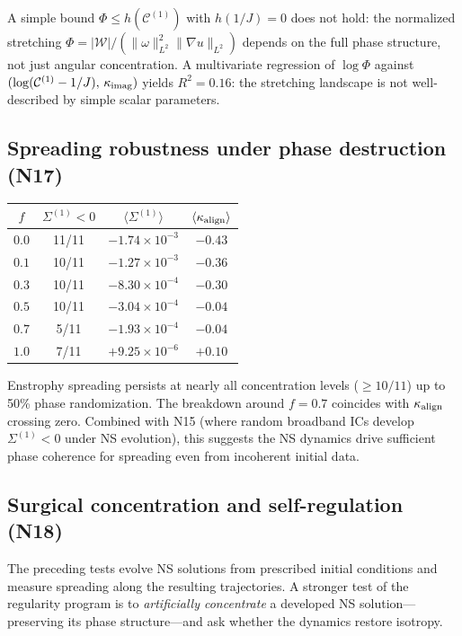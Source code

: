 \documentclass[11pt]{article}
\theoremstyle{definition}
\newcommand{\cC}{\mathcal{C}}
\begin{document}
A simple bound $\Phi\leq h(\cC^{(1)})$ with
$h(1/J)=0$ does not hold: the normalized stretching
$\Phi = |\mathcal{W}|/(\|\omega\|_{L^2}^2
\|\nabla u\|_{L^2})$ depends on the full phase
structure, not just angular concentration.
A multivariate regression of $\log\Phi$ against
$(\log(\cC^{(1)}-1/J),\,\kappa_{\rm imag})$ yields
$R^2=0.16$: the stretching landscape is not
well-described by simple scalar parameters.


\subsection{Spreading robustness under phase
destruction (N17)}
\label{sec:robustness}

\begin{center}
\begin{tabular}{@{}cccc@{}}
\toprule
$f$ & $\Sigma^{(1)}<0$ & $\langle\Sigma^{(1)}\rangle$
  & $\langle\kappa_{\rm align}\rangle$ \\
\midrule
$0.0$ & 11/11 & $-1.74\times 10^{-3}$ & $-0.43$ \\
$0.1$ & 10/11 & $-1.27\times 10^{-3}$ & $-0.36$ \\
$0.3$ & 10/11 & $-8.30\times 10^{-4}$ & $-0.30$ \\
$0.5$ & 10/11 & $-3.04\times 10^{-4}$ & $-0.04$ \\
$0.7$ &  5/11 & $-1.93\times 10^{-4}$ & $-0.04$ \\
$1.0$ &  7/11 & $+9.25\times 10^{-6}$ & $+0.10$ \\
\bottomrule
\end{tabular}
\end{center}

Enstrophy spreading persists at nearly all
concentration levels ($\geq 10/11$) up to 50\%
phase randomization.  The breakdown around $f=0.7$
coincides with $\kappa_{\rm align}$ crossing zero.
Combined with N15 (where random broadband ICs develop
$\Sigma^{(1)}<0$ under NS evolution), this suggests
the NS dynamics drive sufficient phase coherence
for spreading even from incoherent initial data.


\subsection{Surgical concentration and self-regulation (N18)}
\label{sec:surgical}

The preceding tests evolve NS solutions from prescribed
initial conditions and measure spreading along the
resulting trajectories.  A stronger test of the
regularity program is to \emph{artificially concentrate}
a developed NS solution---preserving its phase
structure---and ask whether the dynamics restore
isotropy.
\end{document}
